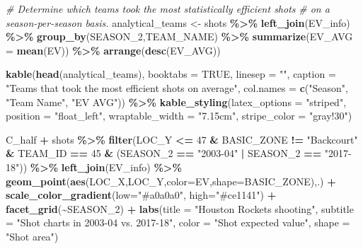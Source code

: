 \documentclass[
  12pt,
  a4paper,
]{article}
\newenvironment{Shaded}{\begin{snugshade}}{\end{snugshade}}
\newcommand{\AttributeTok}[1]{\textcolor[rgb]{0.13,0.29,0.53}{#1}}
\newcommand{\CommentTok}[1]{\textcolor[rgb]{0.56,0.35,0.01}{\textit{#1}}}
\newcommand{\ConstantTok}[1]{\textcolor[rgb]{0.56,0.35,0.01}{#1}}
\newcommand{\DecValTok}[1]{\textcolor[rgb]{0.00,0.00,0.81}{#1}}
\newcommand{\FunctionTok}[1]{\textcolor[rgb]{0.13,0.29,0.53}{\textbf{#1}}}
\newcommand{\NormalTok}[1]{#1}
\newcommand{\OtherTok}[1]{\textcolor[rgb]{0.56,0.35,0.01}{#1}}
\newcommand{\SpecialCharTok}[1]{\textcolor[rgb]{0.81,0.36,0.00}{\textbf{#1}}}
\newcommand{\StringTok}[1]{\textcolor[rgb]{0.31,0.60,0.02}{#1}}
\begin{document}
\begin{Shaded}
\begin{Highlighting}[]
\CommentTok{\# Determine which teams took the most statistically efficient shots}
\CommentTok{\# on a season{-}per{-}season basis.}
\NormalTok{analytical\_teams }\OtherTok{\textless{}{-}}\NormalTok{ shots }\SpecialCharTok{\%\textgreater{}\%}
  \FunctionTok{left\_join}\NormalTok{(EV\_info) }\SpecialCharTok{\%\textgreater{}\%}
  \FunctionTok{group\_by}\NormalTok{(SEASON\_2,TEAM\_NAME) }\SpecialCharTok{\%\textgreater{}\%}
  \FunctionTok{summarize}\NormalTok{(}\AttributeTok{EV\_AVG =} \FunctionTok{mean}\NormalTok{(EV)) }\SpecialCharTok{\%\textgreater{}\%}
  \FunctionTok{arrange}\NormalTok{(}\FunctionTok{desc}\NormalTok{(EV\_AVG))}

\FunctionTok{kable}\NormalTok{(}\FunctionTok{head}\NormalTok{(analytical\_teams), }\AttributeTok{booktabs =} \ConstantTok{TRUE}\NormalTok{, }\AttributeTok{linesep =} \StringTok{""}\NormalTok{,}
      \AttributeTok{caption =} \StringTok{"Teams that took}
\StringTok{                 the most efficient shots on average"}\NormalTok{,}
      \AttributeTok{col.names =} \FunctionTok{c}\NormalTok{(}\StringTok{"Season"}\NormalTok{,}
                    \StringTok{"Team Name"}\NormalTok{,}
                    \StringTok{"EV AVG"}\NormalTok{)) }\SpecialCharTok{\%\textgreater{}\%}
  \FunctionTok{kable\_styling}\NormalTok{(}\AttributeTok{latex\_options =} \StringTok{"striped"}\NormalTok{,}
                \AttributeTok{position =} \StringTok{"float\_left"}\NormalTok{,}
                \AttributeTok{wraptable\_width =} \StringTok{"7.15cm"}\NormalTok{,}
                \AttributeTok{stripe\_color =} \StringTok{"gray!30"}\NormalTok{)}

\NormalTok{C\_half }\SpecialCharTok{+}\NormalTok{ shots }\SpecialCharTok{\%\textgreater{}\%}
  \FunctionTok{filter}\NormalTok{(LOC\_Y }\SpecialCharTok{\textless{}=} \DecValTok{47} \SpecialCharTok{\&}\NormalTok{ BASIC\_ZONE }\SpecialCharTok{!=} \StringTok{"Backcourt"} \SpecialCharTok{\&}\NormalTok{ TEAM\_ID }\SpecialCharTok{==} \DecValTok{45} \SpecialCharTok{\&}
\NormalTok{         (SEASON\_2 }\SpecialCharTok{==} \StringTok{"2003{-}04"} \SpecialCharTok{|}\NormalTok{ SEASON\_2 }\SpecialCharTok{==} \StringTok{"2017{-}18"}\NormalTok{)) }\SpecialCharTok{\%\textgreater{}\%}
  \FunctionTok{left\_join}\NormalTok{(EV\_info) }\SpecialCharTok{\%\textgreater{}\%}
  \FunctionTok{geom\_point}\NormalTok{(}\FunctionTok{aes}\NormalTok{(LOC\_X,LOC\_Y,}\AttributeTok{color=}\NormalTok{EV,}\AttributeTok{shape=}\NormalTok{BASIC\_ZONE),.) }\SpecialCharTok{+}
  \FunctionTok{scale\_color\_gradient}\NormalTok{(}\AttributeTok{low=}\StringTok{"\#a0a0a0"}\NormalTok{, }\AttributeTok{high=}\StringTok{"\#ce1141"}\NormalTok{) }\SpecialCharTok{+}
  \FunctionTok{facet\_grid}\NormalTok{(}\SpecialCharTok{\textasciitilde{}}\NormalTok{SEASON\_2) }\SpecialCharTok{+}
  \FunctionTok{labs}\NormalTok{(}\AttributeTok{title =} \StringTok{"Houston Rockets shooting"}\NormalTok{,}
       \AttributeTok{subtitle =} \StringTok{"Shot charts in 2003{-}04 vs. 2017{-}18"}\NormalTok{,}
       \AttributeTok{color =} \StringTok{"Shot expected value"}\NormalTok{,}
       \AttributeTok{shape =} \StringTok{"Shot area"}\NormalTok{)}


\end{Highlighting}
\end{Shaded}
\end{document}
